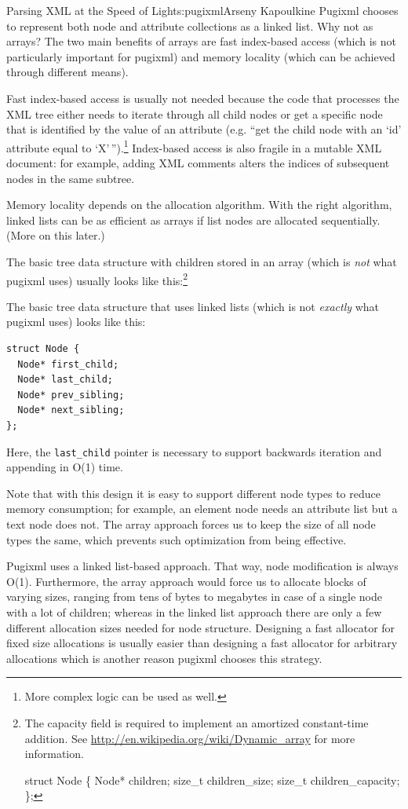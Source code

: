 \begin{aosachapter}{Parsing XML at the Speed of Light}{s:pugixml}{Arseny Kapoulkine}
Pugixml chooses to represent both node and attribute collections as a
linked list. Why not as arrays? The two main benefits of arrays are fast
index-based access (which is not particularly important for pugixml) and
memory locality (which can be achieved through different means).

Fast index-based access is usually not needed because the code that
processes the XML tree either needs to iterate through all child nodes
or get a specific node that is identified by the value of an attribute
(e.g. ``get the child node with an `id' attribute equal to
`X'\,'').\footnote{More complex logic can be used as well.} Index-based
access is also fragile in a mutable XML document: for example, adding
XML comments alters the indices of subsequent nodes in the same subtree.

Memory locality depends on the allocation algorithm. With the right
algorithm, linked lists can be as efficient as arrays if list nodes are
allocated sequentially. (More on this later.)

The basic tree data structure with children stored in an array (which is
\emph{not} what pugixml uses) usually looks like this:\footnote{The
  capacity field is required to implement an amortized constant-time
  addition. See \mbox{\url{http://en.wikipedia.org/wiki/Dynamic_array}}
  for more information.

  struct Node \{ Node* children; size\_t children\_size; size\_t
  children\_capacity; \};}

The basic tree data structure that uses linked lists (which is not
\emph{exactly} what pugixml uses) looks like this:

\begin{verbatim}
struct Node {
  Node* first_child;
  Node* last_child;
  Node* prev_sibling;
  Node* next_sibling;
};
\end{verbatim}

Here, the \texttt{last\_child} pointer is necessary to support backwards
iteration and appending in O(1) time.

Note that with this design it is easy to support different node types to
reduce memory consumption; for example, an element node needs an
attribute list but a text node does not. The array approach forces us to
keep the size of all node types the same, which prevents such
optimization from being effective.

Pugixml uses a linked list-based approach. That way, node modification
is always O(1). Furthermore, the array approach would force us to
allocate blocks of varying sizes, ranging from tens of bytes to
megabytes in case of a single node with a lot of children; whereas in
the linked list approach there are only a few different allocation sizes
needed for node structure. Designing a fast allocator for fixed size
allocations is usually easier than designing a fast allocator for
arbitrary allocations which is another reason pugixml chooses this
strategy.


\end{aosachapter}
